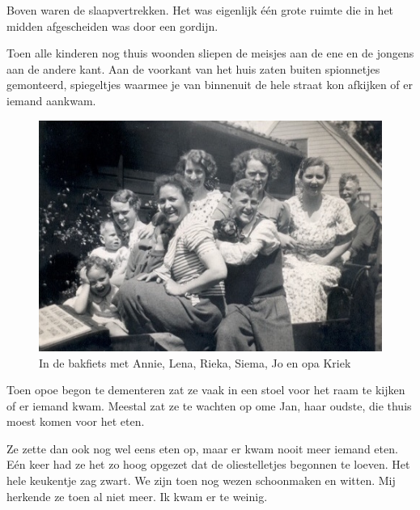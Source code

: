 \documentclass[12pt,twoside]{memoir}
\begin{document}
Boven waren de slaapvertrekken. Het was eigenlijk één grote ruimte die in het midden afgescheiden was door een gordijn. 

Toen alle kinderen nog thuis woonden sliepen de meisjes aan de ene en de jongens aan de andere kant. Aan de voorkant van het huis zaten buiten spionnetjes gemonteerd, spiegeltjes waarmee je van binnenuit de hele straat kon afkijken of er iemand aankwam. 

\begin{figure}
\includegraphics[width=\textwidth]{img/ch3/indebakfiets}
\caption*{\footnotesize In de bakfiets met Annie, Lena, Rieka, Siema, Jo en opa Kriek}
\end{figure}

Toen opoe begon te dementeren zat ze vaak in een stoel voor het raam te kijken of er iemand kwam. Meestal zat ze te wachten op ome Jan, haar oudste, die thuis moest komen voor het eten. 

Ze zette dan ook nog wel eens eten op, maar er kwam nooit meer iemand eten. Eén keer had ze het zo hoog opgezet dat de oliestelletjes begonnen te loeven. Het hele keukentje zag zwart. We zijn toen nog wezen schoonmaken en witten. Mij herkende ze toen al niet meer. Ik kwam er te weinig.
\end{document}
